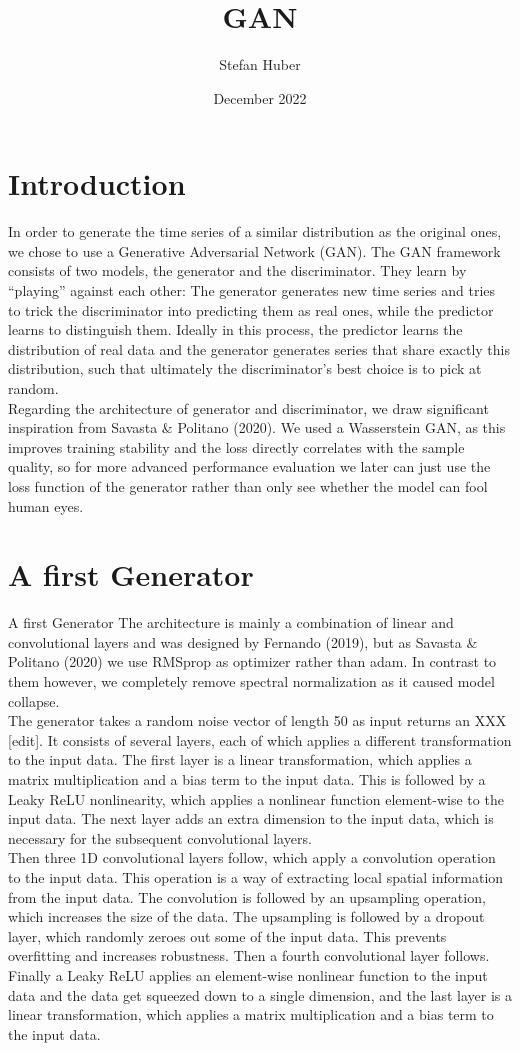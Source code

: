 \documentclass{article}
\title{GAN}
\author{Stefan Huber}
\date{December 2022}
\begin{document}
\maketitle
\section{Introduction}
In order to generate the time series of a similar distribution as the original ones, we chose to use a Generative 
Adversarial Network (GAN). The GAN framework consists of two models, the generator and the discriminator. They 
learn by “playing” against each other: The generator generates new time series and tries to trick the discriminator 
into predicting them as real ones, while the predictor learns to distinguish them. Ideally in this process, the 
predictor learns the distribution of real data and the generator generates series that share exactly this distribution,
such that ultimately the discriminator's best choice is to pick at random. \\
Regarding the architecture of generator and discriminator, we draw significant inspiration from Savasta \& 
Politano (2020). We used a Wasserstein GAN, as this improves training stability and the loss directly correlates 
with the sample quality, so for more advanced performance evaluation we later can just use the loss function of 
the generator rather than only see whether the model can fool human eyes.
\section{A first Generator}
A first Generator
The architecture is mainly a combination of linear and convolutional layers and was designed by Fernando (2019), but 
as Savasta & Politano (2020) we use RMSprop as optimizer rather than adam. In contrast to them however, we completely 
remove spectral normalization as it caused model collapse. \\
The generator takes a random noise vector of length 50 as input returns an XXX [edit]. It consists of several layers, 
each of which applies a different transformation to the input data. The first layer is a linear transformation, which 
applies a matrix multiplication and a bias term to the input data. This is followed by a Leaky ReLU nonlinearity, 
which applies a nonlinear function element-wise to the input data. The next layer adds an extra dimension to the 
input data, which is necessary for the subsequent convolutional layers. \\
Then three 1D convolutional layers follow, which apply a convolution operation to the input data. This operation is 
a way of extracting local spatial information from the input data. The convolution is followed by an upsampling 
operation, which increases the size of the data. The upsampling is followed by a dropout layer, which randomly zeroes 
out some of the input data. This prevents overfitting and increases robustness. Then a fourth convolutional layer 
follows. \\
Finally a Leaky ReLU applies an element-wise nonlinear function to the input data and the data get squeezed down to 
a single dimension, and the last layer is a linear transformation, which applies a matrix multiplication and a bias 
term to the input data.
\end{document}
